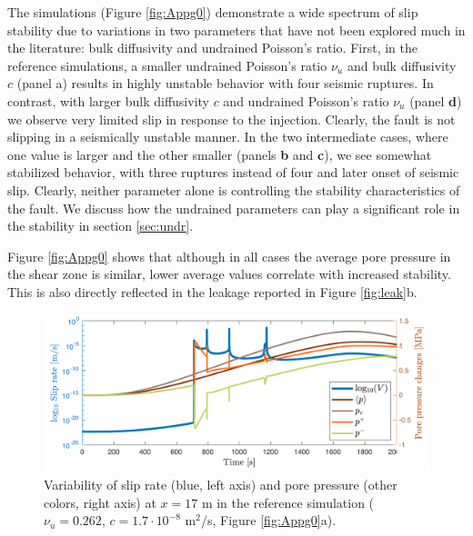 \documentclass[draft]{agujournal2019}
\begin{document}
The simulations (Figure \ref{fig:Appg0}) demonstrate a wide spectrum of slip stability due to variations in two parameters that have not been explored much in the literature: bulk diffusivity and undrained Poisson's ratio. First, in the reference simulations, a smaller undrained Poisson's ratio $\nu_u$ and bulk diffusivity $c$ (panel a) results in highly unstable behavior with four seismic ruptures.  In contrast, with larger bulk diffusivity $c$ and undrained Poisson's ratio $\nu_u$ (panel {\bf d}) we observe very limited slip in response to the injection. Clearly, the fault is not slipping in a seismically unstable manner.  In the two intermediate cases, where one value is larger and the other smaller (panels {\bf b} and {\bf c}), we see somewhat stabilized behavior, with three ruptures instead of four and later onset of seismic slip. Clearly, neither parameter alone is controlling the stability characteristics of the fault. We discuss how the undrained parameters can play a significant role in the stability in section \ref{sec:undr}.

Figure \ref{fig:Appg0} shows that although in all cases the average pore pressure in the shear zone is similar, lower average values correlate with increased stability. This is also directly reflected in the leakage reported in Figure \ref{fig:leak}b. 

\begin{figure}[H]
\centering
\includegraphics[scale =  0.85]{Figures/logV_and_pressure_atpoint.pdf} %
\caption{Variability of slip rate (blue, left axis) and pore pressure (other colors, right axis) at $x = 17$ m in the reference simulation ($\nu_u = 0.262$, $c = 1.7 \cdot 10^{-8}$ m$^2$/s, Figure \ref{fig:Appg0}a).  }
\label{fig:Vandpatpoint}
\end{figure}
\end{document}
